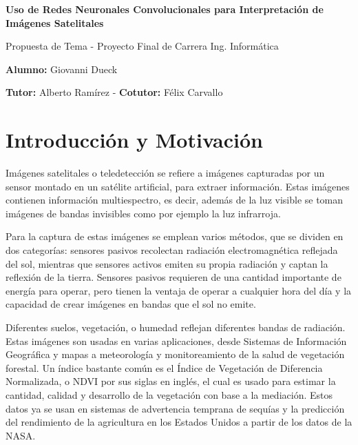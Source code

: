 \documentclass[a4paper, 11pt]{article}
\begin{document}
\begin{center}
    \Large{\bf Uso de Redes Neuronales Convolucionales para Interpretación de Imágenes Satelitales}

    Propuesta de Tema - Proyecto Final de Carrera Ing. Informática

    {\bf Alumno:} Giovanni Dueck

    {\bf Tutor:} Alberto Ramírez - {\bf Cotutor:} Félix Carvallo
\end{center}

\section*{Introducción y Motivación}

Imágenes satelitales o teledetección se refiere a imágenes capturadas por un sensor montado en un satélite artificial, para extraer información. Estas imágenes contienen información multiespectro, es decir, además de la luz visible se toman imágenes de bandas invisibles como por ejemplo la luz infrarroja. \autocite{globalforestlink-how-sat-imaging-work}

Para la captura de estas imágenes se emplean varios métodos, que se dividen en dos categorías: sensores pasivos recolectan radiación electromagnética reflejada del sol, mientras que sensores activos emiten su propia radiación y captan la reflexión de la tierra. Sensores pasivos requieren de una cantidad importante de energía para operar, pero tienen la ventaja de operar a cualquier hora del día y la capacidad de crear imágenes en bandas que el sol no emite. \autocite{globalforestlink-how-sat-imaging-work}

Diferentes suelos, vegetación, o humedad reflejan diferentes bandas de radiación. Estas imágenes son usadas en varias aplicaciones, desde Sistemas de Información Geográfica y mapas a meteorología y monitoreamiento de la salud de vegetación forestal. Un índice bastante común es el Índice de Vegetación de Diferencia Normalizada, o NDVI por sus siglas en inglés, el cual es usado para estimar la cantidad, calidad y desarrollo de la vegetación con base a la mediación. Estos datos ya se usan en sistemas de advertencia temprana de sequías y la predicción del rendimiento de la agricultura en los Estados Unidos a partir de los datos de la NASA. \autocite{earthdata-vegetation}
\end{document}
